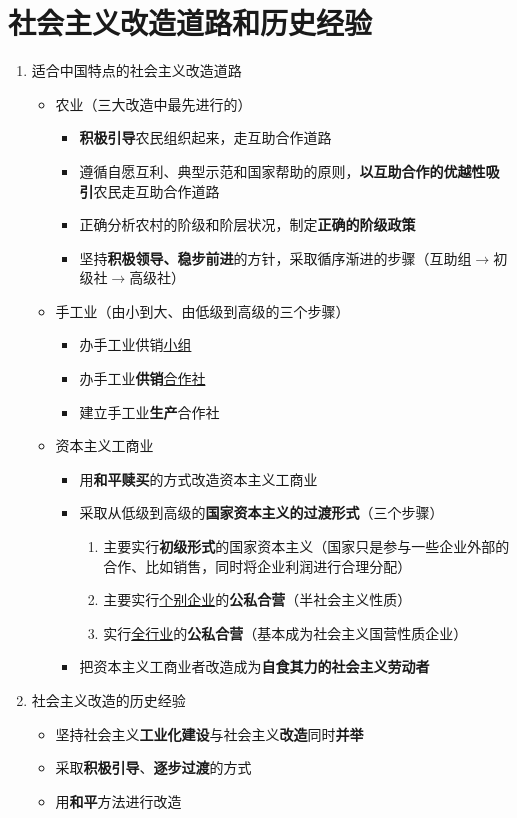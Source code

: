 \documentclass[12pt,openany]{ctexbook}
\begin{document}
\section{社会主义改造道路和历史经验}
\begin{enumerate}
  \item 适合中国特点的社会主义改造道路
\begin{itemize}
  \item 农业（三大改造中最先进行的）
\begin{itemize}
  \item \textbf{积极引导}农民组织起来，走互助合作道路
  \item 遵循自愿互利、典型示范和国家帮助的原则，\textbf{以互助合作的优越性吸引}农民走互助合作道路
  \item 正确分析农村的阶级和阶层状况，制定\textbf{正确的阶级政策}
  \item 坚持\textbf{积极领导、稳步前进}的方针，采取循序渐进的步骤（互助组$\to$初级社$\to$高级社）
\end{itemize}
  \item 手工业（由小到大、由低级到高级的三个步骤）
\begin{itemize}
  \item 办手工业供销\underline{小组}
  \item 办手工业\textbf{供销}\underline{合作社}
  \item 建立手工业\textbf{生产}合作社
\end{itemize}
  \item 资本主义工商业
\begin{itemize}
  \item 用\textbf{和平赎买}的方式改造资本主义工商业
  \item 采取从低级到高级的\textbf{国家资本主义的过渡形式}（三个步骤）
\begin{enumerate}
  \item 主要实行\textbf{初级形式}的国家资本主义（国家只是参与一些企业外部的合作、比如销售，同时将企业利润进行合理分配）
  \item 主要实行\underline{个别企业}的\textbf{公私合营}（半社会主义性质）
  \item 实行\underline{全行业}的\textbf{公私合营}（基本成为社会主义国营性质企业）
\end{enumerate}
  \item 把资本主义工商业者改造成为\textbf{自食其力的社会主义劳动者}
\end{itemize}
\end{itemize}
  \item 社会主义改造的历史经验
\begin{itemize}
  \item 坚持社会主义\textbf{工业化建设}与社会主义\textbf{改造}同时\textbf{并举}
  \item 采取\textbf{积极引导}、\textbf{逐步过渡}的方式
  \item 用\textbf{和平}方法进行改造
\end{itemize}
\end{enumerate}
\end{document}
